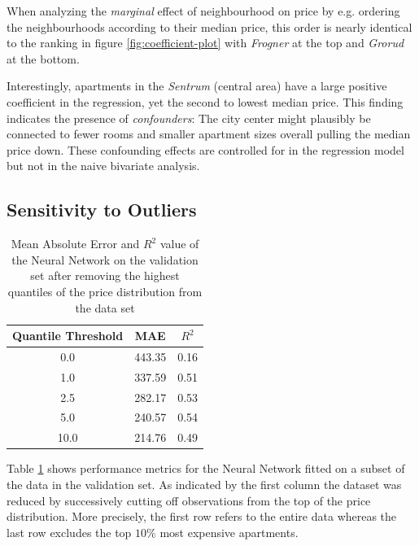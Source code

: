 \documentclass[12pt, letterpaper]{article}
\begin{document}
When analyzing the \emph{marginal} effect of neighbourhood on price by e.g. ordering the neighbourhoods according to their median price, this order is nearly identical to the ranking in figure \ref{fig:coefficient-plot} with \emph{Frogner} at the top and \emph{Grorud} at the bottom.

Interestingly, apartments in the \emph{Sentrum} (central area) have a large positive coefficient in the regression, yet the second to lowest median price.
This finding indicates the presence of \emph{confounders}:
The city center might plausibly be connected to fewer rooms and smaller apartment sizes overall pulling the median price down.
These confounding effects are controlled for in the regression model but not in the naive bivariate analysis.


\subsection{Sensitivity to Outliers} \label{outliers}

\begin{table}[t]
    \centering
    \begin{tabular}{@{}ccc@{}}
        \toprule
        \textbf{Quantile Threshold} & \textbf{MAE} & \textbf{$R^2$} \\ \midrule
        0.0                         & 443.35       & 0.16           \\
        1.0                         & 337.59       & 0.51           \\
        2.5                         & 282.17       & 0.53           \\
        5.0                         & 240.57       & 0.54           \\
        10.0                        & 214.76       & 0.49           \\ \bottomrule
    \end{tabular}
    \caption{Mean Absolute Error and $R^2$ value of the Neural Network on the validation set after removing the highest quantiles of the price distribution from the data set}
    \label{tab:mlp-outliers}
\end{table}

Table \ref{tab:mlp-outliers} shows performance metrics for the Neural Network fitted on a subset of the data in the validation set.
As indicated by the first column the dataset was reduced by successively cutting off observations from the top of the price distribution.
More precisely, the first row refers to the entire data whereas the last row excludes the top $10$\% most expensive apartments.
\end{document}
